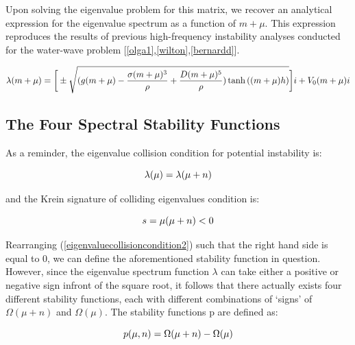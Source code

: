 \documentclass{article}
\begin{document}
\vspace{10} 

Upon solving the eigenvalue problem for this matrix, we recover an analytical expression for the eigenvalue spectrum as a function of \(m + \mu\). This expression reproduces the results of previous high-frequency instability analyses conducted for the water-wave problem [\ref{olga1},\ref{wilton},\ref{bernardd}].


\begin{equation} \label{eigenvalue}
  \lambda(m + \mu) = \bigg[\pm\sqrt{(g(m+\mu) - \frac{\sigma(m+\mu)^3}{\rho} + \frac{D(m+\mu)^5}{\rho})\tanh{((m+\mu)h)}}\bigg]i + V_{0}(m+\mu)i 
\\
\end{equation}


\vspace{15}

\subsection{The Four Spectral Stability Functions}

As a reminder, the eigenvalue collision condition for potential instability is:


\begin{equation} \label{eigenvaluecollisioncondition2}
  \lambda(\mu) = \lambda(\mu + n)
\\
\end{equation}

and the Krein signature of colliding eigenvalues condition is:

 \begin{equation} \label{krein2b}
  s = \mu(\mu + n) < 0
\\
\end{equation}


Rearranging (\ref{eigenvaluecollisioncondition2}) such that the right hand side is equal to 0, we can define the aforementioned stability function in question. However, since the eigenvalue spectrum function \(\lambda\) can take either a positive or negative sign infront of the square root, it follows that there actually exists four different stability functions, each with different combinations of `signs' of \(\Omega(\mu + n)\) and \(\Omega(\mu)\). The stability functions p are defined as:

 \begin{equation} \label{eq1}
  p(\mu,n) = \Omega(\mu + n) - \Omega(\mu)
\\
\end{equation}
\end{document}

